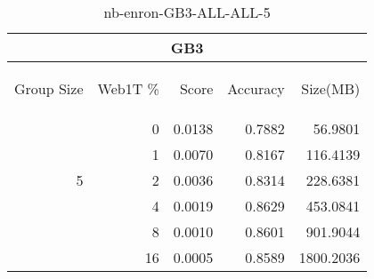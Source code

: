 \begin{center}
\begin{table}[htbp]
\begin{tabular}{ | r | r | r | r | r |}
\hline
\multicolumn{5}{|c|}{GB3}\\
\hline
\begin{sideways}Group Size\end{sideways} & \begin{sideways}Web1T \%\end{sideways} & \begin{sideways}Score\end{sideways} & \begin{sideways}Accuracy\end{sideways} & \begin{sideways}Size(MB)\end{sideways}\\
\hline
\multirow{5}{*}{5}
 & 0 & 0.0138 & 0.7882 & 56.9801\\ \cline{2-5}
 & 1 & 0.0070 & 0.8167 & 116.4139\\ \cline{2-5}
 & 2 & 0.0036 & 0.8314 & 228.6381\\ \cline{2-5}
 & 4 & 0.0019 & 0.8629 & 453.0841\\ \cline{2-5}
 & 8 & 0.0010 & 0.8601 & 901.9044\\ \cline{2-5}
 & 16 & 0.0005 & 0.8589 & 1800.2036\\ \cline{2-5}
\hline
\end{tabular}
\caption{nb-enron-GB3-ALL-ALL-5}
\label{table:nb-enron-GB3-ALL-ALL-5}
\end{table}
\end{center}

